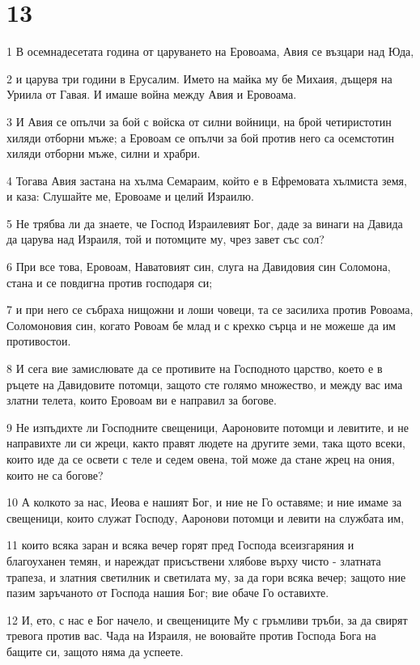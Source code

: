 \chapter{13}

\par 1 В осемнадесетата година от царуването на Еровоама, Авия се възцари над Юда,
\par 2 и царува три години в Ерусалим. Името на майка му бе Михаия, дъщеря на Уриила от Гавая. И имаше война между Авия и Еровоама.
\par 3 И Авия се опълчи за бой с войска от силни войници, на брой четиристотин хиляди отборни мъже; а Еровоам се опълчи за бой против него са осемстотин хиляди отборни мъже, силни и храбри.
\par 4 Тогава Авия застана на хълма Семараим, който е в Ефремовата хълмиста земя, и каза: Слушайте ме, Еровоаме и целий Израилю.
\par 5 Не трябва ли да знаете, че Господ Израилевият Бог, даде за винаги на Давида да царува над Израиля, той и потомците му, чрез завет със сол?
\par 6 При все това, Еровоам, Наватовият син, слуга на Давидовия син Соломона, стана и се повдигна против господаря си;
\par 7 и при него се събраха нищожни и лоши човеци, та се засилиха против Ровоама, Соломоновия син, когато Ровоам бе млад и с крехко сърца и не можеше да им противостои.
\par 8 И сега вие замислювате да се противите на Господното царство, което е в ръцете на Давидовите потомци, защото сте голямо множество, и между вас има златни телета, които Еровоам ви е направил за богове.
\par 9 Не изпъдихте ли Господните свещеници, Аароновите потомци и левитите, и не направихте ли си жреци, както правят людете на другите земи, така щото всеки, които иде да се освети с теле и седем овена, той може да стане жрец на ония, които не са богове?
\par 10 А колкото за нас, Иеова е нашият Бог, и ние не Го оставяме; и ние имаме за свещеници, които служат Господу, Ааронови потомци и левити на службата им,
\par 11 които всяка заран и всяка вечер горят пред Господа всеизгаряния и благоуханен темян, и нареждат присъствени хлябове върху чисто - златната трапеза, и златния светилник и светилата му, за да гори всяка вечер; защото ние пазим заръчаното от Господа нашия Бог; вие обаче Го оставихте.
\par 12 И, ето, с нас е Бог начело, и свещениците Му с гръмливи тръби, за да свирят тревога против вас. Чада на Израиля, не воювайте против Господа Бога на бащите си, защото няма да успеете.

